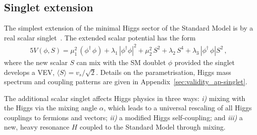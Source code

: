 \subsection{Singlet extension}
\label{sec:validity_singlet}

The simplest extension of the minimal Higgs sector of the Standard
Model is by a real scalar singlet~\cite{singlet}. The extended scalar
potential has the form
%
\begin{alignat}{5} V(\phi,S) = \mu^2_1\,(\phi^\dagger\,\phi) +
\lambda_1\,|\phi^{\dagger}\phi|^2 + \mu^2_2\,S^2 + \lambda_2\,S^4 +
\lambda_3\,|\phi^{\dagger}\,\phi|S^2 \,,
\label{eq:singlet-potential}
\end{alignat}
%
where the new scalar $S$ can mix with the SM doublet $\phi$ provided
the singlet develops a VEV, $\langle S \rangle =
v_s/\sqrt{2}$. Details on the parametrisation, Higgs mass spectrum and
coupling patterns are given in Appendix~\ref{sec:validity_ap-singlet}.

The additional scalar singlet affects Higgs physics in three ways:
\textit{i)} mixing with the Higgs via the mixing angle $\alpha$, which
leads to a universal rescaling of all Higgs couplings to fermions and
vectors; \textit{ii)} a modified Higgs self-coupling; and
\textit{iii)} a new, heavy resonance $H$ coupled to the Standard Model
through mixing.

